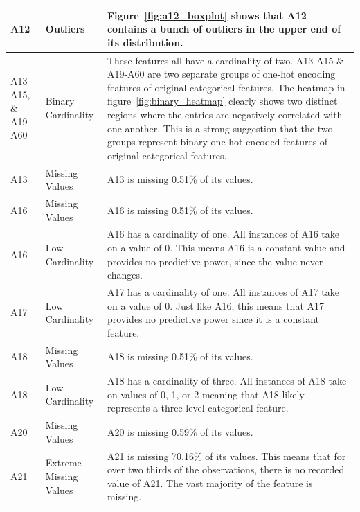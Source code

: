 \documentclass[11pt]{report}
\begin{document}
\begin{longtable}{lp{5cm}p{8cm}}
\midrule
A12 & Outliers & Figure~\ref{fig:a12_boxplot} shows that A12 contains a bunch of outliers in the upper end of its distribution. \\
\midrule
A13-A15, \& A19-A60 & Binary Cardinality & These features all have a cardinality of two. A13-A15 \& A19-A60 are two separate groups of one-hot encoding features of original categorical features. The heatmap in figure~\ref{fig:binary_heatmap} clearly shows two distinct regions where the entries are negatively correlated with one another. This is a strong suggestion that the two groups represent binary one-hot encoded features of original categorical features. \\
\midrule
A13 & Missing Values & A13 is missing 0.51\% of its values. \\
\midrule
A16 & Missing Values & A16 is missing 0.51\% of its values. \\
\midrule
A16 & Low Cardinality & A16 has a cardinality of one. All instances of A16 take on a value of 0. This means A16 is a constant value and provides no predictive power, since the value never changes. \\
\midrule
A17 & Low Cardinality & A17 has a cardinality of one. All instances of A17 take on a value of 0. Just like A16, this means that A17 provides no predictive power since it is a constant feature. \\ 
\midrule
A18 & Missing Values & A18 is missing 0.51\% of its values. \\
\midrule
A18 & Low Cardinality & A18 has a cardinality of three. All instances of A18 take on values of 0, 1, or 2 meaning that A18 likely represents a three-level categorical feature. \\
\midrule
A20 & Missing Values & A20 is missing 0.59\% of its values. \\
\midrule
A21 & Extreme Missing Values & A21 is missing 70.16\% of its values. This means that for over two thirds of the observations, there is no recorded value of A21. The vast majority of the feature is missing. \\
\midrule

\end{longtable}
\end{document}
